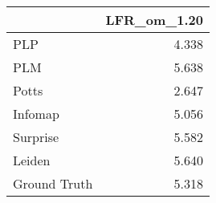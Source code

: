 \begin{tabular}{lr}
\toprule
{} & LFR_om_1.20 \\
\midrule
PLP          &       4.338 \\
PLM          &       5.638 \\
Potts        &       2.647 \\
Infomap      &       5.056 \\
Surprise     &       5.582 \\
Leiden       &       5.640 \\
Ground Truth &       5.318 \\
\bottomrule
\end{tabular}
